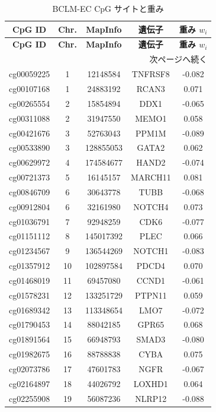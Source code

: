 \documentclass[12pt,a4paper]{ltjsarticle}
\begin{document}
	\begin{longtable}{|c|c|c|c|c|}
		\caption{BCLM-EC CpG サイトと重み}\label{tab:cpgs}\\
		\hline
		\textbf{CpG ID} & \textbf{Chr.} & \textbf{MapInfo} & \textbf{遺伝子} & \textbf{重み \(w_i\)} \\
		\hline
		\endfirsthead
		\hline
		\textbf{CpG ID} & \textbf{Chr.} & \textbf{MapInfo} & \textbf{遺伝子} & \textbf{重み \(w_i\)} \\
		\hline
		\endhead
		\hline
		\multicolumn{5}{r}{次ページへ続く}\\
		\endfoot
		\hline
		\endlastfoot
		cg00059225 & 1 & 12148584 & TNFRSF8 & -0.082 \\
		cg00107168 & 1 & 24883192 & RCAN3 & 0.071 \\
		cg00265554 & 2 & 15854894 & DDX1 & -0.065 \\
		cg00311088 & 2 & 31947550 & MEMO1 & 0.058 \\
		cg00421676 & 3 & 52763043 & PPM1M & -0.089 \\
		cg00533890 & 3 & 128855053 & GATA2 & 0.062 \\
		cg00629972 & 4 & 174584677 & HAND2 & -0.074 \\
		cg00721373 & 5 & 16145157 & MARCH11 & 0.081 \\
		cg00846709 & 6 & 30643778 & TUBB & -0.068 \\
		cg00912804 & 6 & 32161980 & NOTCH4 & 0.073 \\
		cg01036791 & 7 & 92948259 & CDK6 & -0.077 \\
		cg01151112 & 8 & 145017392 & PLEC & 0.066 \\
		cg01234567 & 9 & 136544269 & NOTCH1 & -0.083 \\
		cg01357912 & 10 & 102897584 & PDCD4 & 0.070 \\
		cg01468019 & 11 & 69457080 & CCND1 & -0.061 \\
		cg01578231 & 12 & 133251729 & PTPN11 & 0.059 \\
		cg01689342 & 13 & 113348654 & LMO7 & -0.072 \\
		cg01790453 & 14 & 88042185 & GPR65 & 0.068 \\
		cg01891564 & 15 & 66948793 & SMAD3 & -0.080 \\
		cg01982675 & 16 & 88788838 & CYBA & 0.075 \\
		cg02073786 & 17 & 47601783 & NGFR & -0.067 \\
		cg02164897 & 18 & 44026792 & LOXHD1 & 0.064 \\
		cg02255908 & 19 & 56087236 & NLRP12 & -0.088 \\

\end{longtable}
\end{document}
